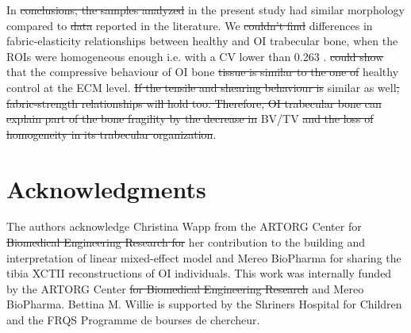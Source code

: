 \documentclass[a4paper,fleqn]{DC_ArtStyle}
\providecommand{\DIFadd}[1]{{\protect\color{blue}{#1}}} %
\providecommand{\DIFdel}[1]{{\protect\color{red}\sout{#1}}}                      %
\providecommand{\DIFaddbegin}{} %
\providecommand{\DIFaddend}{} %
\providecommand{\DIFdelbegin}{} %
\providecommand{\DIFdelend}{} %
\begin{document}
In \DIFdelbegin \DIFdel{conclusions, the samples analyzed }\DIFdelend \DIFaddbegin \DIFadd{conclusion, the OI trabecular bone from the distal tibia analysed }\DIFaddend in the present study had similar morphology compared to \DIFdelbegin \DIFdel{data }\DIFdelend \DIFaddbegin \DIFadd{those }\DIFaddend reported in the literature. We \DIFdelbegin \DIFdel{couldn't find }\DIFdelend \DIFaddbegin \DIFadd{could not find statistically significant }\DIFaddend differences in fabric-elasticity relationships between healthy and OI trabecular bone, when the ROIs were homogeneous enough i.e. with a CV lower than 0.263 \DIFaddbegin \DIFadd{and were matched for BV/TV and DA}\DIFaddend .
\citeauthor{Indermaur2021}\cite{Indermaur2021} \DIFdelbegin \DIFdel{could show }\DIFdelend \DIFaddbegin \DIFadd{found }\DIFaddend that the compressive behaviour of OI bone \DIFdelbegin \DIFdel{tissue is similar to the one of }\DIFdelend \DIFaddbegin \DIFadd{extracellular matrix is not inferior to }\DIFaddend healthy control at the ECM level. \DIFdelbegin \DIFdel{If the tensile and shearing behaviour is }\DIFdelend \DIFaddbegin \DIFadd{Similar results for tensile properties at the extracellular matrix level would indicate that fabric-strength relationships may be }\DIFaddend similar as well\DIFdelbegin \DIFdel{, fabric-strength relationships will hold too. Therefore, OI trabecular bone can explain part of the bone fragility by the decrease in }\DIFdelend \DIFaddbegin \DIFadd{. Under this hypothesis, fragility of OI bone should mainly be explained by thin cortices and low }\DIFaddend BV/TV \DIFdelbegin \DIFdel{and the loss of homogeneity in its trabecular organization}\DIFdelend \DIFaddbegin \DIFadd{of the trabecular compartment}\DIFaddend .

\DIFaddbegin 

\DIFaddend \section*{Acknowledgments}
The authors acknowledge Christina Wapp from the ARTORG Center for \DIFdelbegin \DIFdel{Biomedical Engineering Research for }\DIFdelend her contribution to the building and interpretation of linear mixed-effect model and Mereo BioPharma for sharing the tibia XCTII reconstructions of OI individuals. This work was internally funded by the ARTORG Center \DIFdelbegin \DIFdel{for Biomedical Engineering Research }\DIFdelend and Mereo BioPharma.  Bettina M. Willie is supported by the Shriners Hospital for Children and the FRQS Programme de bourses de chercheur. 
\end{document}
